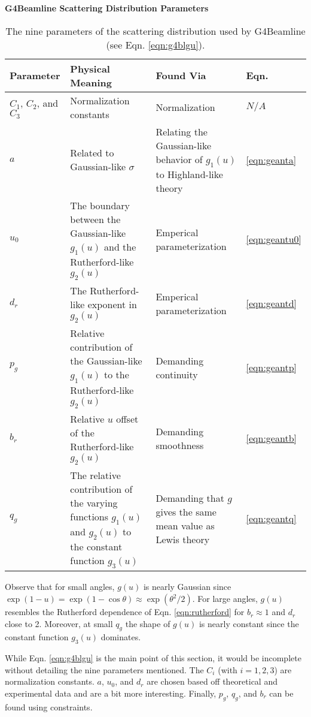 \begin{table}
\caption*{\textbf{G4Beamline Scattering Distribution Parameters}}
\begin{tabularx}{\textwidth}{| A | B | B | C |}
\hline \hline
	\textbf{Parameter} & \textbf{Physical Meaning} & \textbf{Found Via} & \textbf{Eqn.} \\ \hline
	$C_1$, $C_2$, and $C_3$ & Normalization constants & Normalization & $N/A$ \\ \hline
	$a$ & Related to Gaussian-like $\sigma$ & Relating the Gaussian-like behavior of $g_1(u)$ to Highland-like theory \cite{highland} & \ref{eqn:geanta} \\ \hline
	$u_0$ & The boundary between the Gaussian-like $g_1(u)$ and the Rutherford-like $g_2(u)$ & Emperical parameterization & \ref{eqn:geantu0} \\ \hline
	$d_r$ & The Rutherford-like exponent in $g_2(u)$ & Emperical parameterization & \ref{eqn:geantd} \\ \hline
	$p_g$ & Relative contribution of the Gaussian-like $g_1(u)$ to the Rutherford-like $g_2(u)$ & Demanding continuity & \ref{eqn:geantp} \\ \hline
	$b_r$ & Relative $u$ offset of the Rutherford-like $g_2(u)$ & Demanding smoothness & \ref{eqn:geantb} \\ \hline
	$q_g$ & The relative contribution of the varying functions $g_1(u)$ and $g_2(u)$ to the constant function $g_3(u)$ & Demanding that $g$ gives the same mean value as Lewis theory & \ref{eqn:geantq}\\
\hline
\end{tabularx}
\caption[G4Beamline scattering distribution parameters.]{The nine parameters of the scattering distribution used by G4Beamline (see Eqn. \ref{eqn:g4blgu}).}
\label{tbl:g4blgu_parameters}
\end{table}


Observe that for small angles, $g(u)$ is nearly Gaussian since $\exp{(1-u)}=\exp{(1-\cos\theta)}\approx\exp{(\theta^2/2)}$. For large angles, $g(u)$ resembles the Rutherford dependence of Eqn. \ref{eqn:rutherford} for $b_r\approx 1$ and $d_r$ close to 2. Moreover, at small $q_g$ the shape of $g(u)$ is nearly constant since the constant function $g_3(u)$ dominates.

While Eqn. \ref{eqn:g4blgu} is the main point of this section, it would be incomplete without detailing the nine parameters mentioned. The $C_i$ (with $i=1,2,3$) are normalization constants. $a$, $u_0$, and $d_r$ are chosen based off theoretical and experimental data and are a bit more interesting. Finally, $p_g$, $q_g$, and $b_r$ can be found using constraints. 

